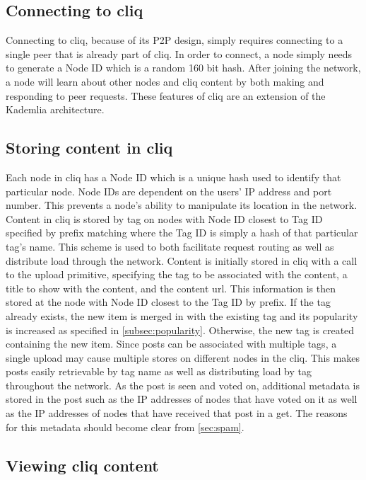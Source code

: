 \documentclass{sig-alternate}
\begin{document}
\subsection{Connecting to cliq}

Connecting to cliq, because of its P2P design, simply requires connecting to a single peer that is already part of cliq. 
In order to connect, a node simply needs to generate a Node ID which is a random 160 bit hash. 
After joining the network, a node will learn about other nodes and cliq content by both making and responding to peer requests. 
These features of cliq are an extension of the Kademlia architecture.

\subsection{Storing content in cliq}
\label{subsec:upload}

Each node in cliq has a Node ID which is a unique hash used to identify that particular node. Node IDs are dependent on the users' IP address and port number. This prevents a node's ability to manipulate its location in the network.   
Content in cliq is stored by tag on nodes with Node ID closest to Tag ID specified by prefix matching where the Tag ID is simply a hash of that particular tag's name. 
This scheme is used to both facilitate request routing as well as distribute load through the network. 
Content is initially stored in cliq with a call to the upload primitive, specifying the tag to be associated with the content, a title to show with the content, and the content url. 
This information is then stored at the node with Node ID closest to the Tag ID by prefix. 
If the tag already exists, the new item is merged in with the existing tag and its popularity is increased as specified in \ref{subsec:popularity}. 
Otherwise, the new tag is created containing the new item. 
Since posts can be associated with multiple tags, a single upload may cause multiple stores on different nodes in the cliq. 
This makes posts easily retrievable by tag name as well as distributing load by tag throughout the network. 
As the post is seen and voted on, additional metadata is stored in the post such as the IP addresses of nodes that have voted on it as well as the IP addresses of nodes that have received that post in a get. 
The reasons for this metadata should become clear from \ref{sec:spam}. 

\subsection{Viewing cliq content}
\end{document}
